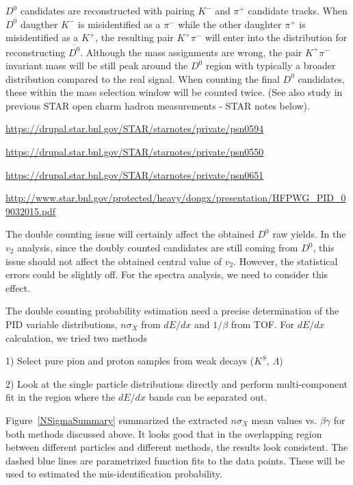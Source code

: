 

$D^0$ candidates are reconstructed with pairing $K^-$ and $\pi^+$ candidate tracks. When $D^0$ daugther $K^-$ is misidentified as a $\pi^-$ while the other daughter $\pi^+$ is misidentified as a $K^+$, the resulting pair $K^+\pi^-$ will enter into the distribution for reconstructing $\overline{D^0}$. Although the mass assignments are wrong, the pair $K^+\pi^-$ invariant mass will be still peak around the $D^0$ region with typically a broader distribution compared to the real signal. When counting the final $D^0$ candidates, these within the mass selection window will be counted twice. (See also study in previous STAR open charm hadron measurements - STAR notes below).

\url{https://drupal.star.bnl.gov/STAR/starnotes/private/psn0594}

\url{https://drupal.star.bnl.gov/STAR/starnotes/private/psn0550}

\url{https://drupal.star.bnl.gov/STAR/starnotes/private/psn0651}

\url{http://www.star.bnl.gov/protected/heavy/dongx/presentation/HFPWG_PID_09032015.pdf}

The double counting issue will certainly affect the obtained $D^0$ raw yields. In the $v_2$ analysis, since the doubly counted candidates are still coming from $D^0$, this issue should not affect the obtained central value of $v_2$. However, the statistical errors could be slightly off. For the spectra analysis, we need to consider this effect.

The double counting probability estimation need a precise determination of the PID variable distributions, $n\sigma_X$ from $dE/dx$ and $1/\beta$ from TOF. For $dE/dx$ calculation, we tried two methods

1) Select pure pion and proton samples from weak decays ($K^{S}$, $\Lambda$)

2) Look at the single particle distributions directly and perform multi-component fit in the region where the $dE/dx$ bands can be separated out.

Figure~\ref{NSigmaSummary} summarized the extracted $n\sigma_{X}$ mean values vs. $\beta\gamma$ for both methods discussed above. It looks good that in the overlapping region between different particles and different methods, the results look consistent. The dashed blue lines are parametrized function fits to the data points. These will be used to estimated the mis-identification probability.

